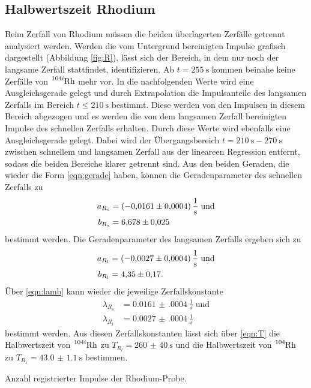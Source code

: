 \subsection{Halbwertszeit Rhodium}
\label{Rhodium}
Beim Zerfall von Rhodium müssen die beiden überlagerten Zerfälle getrennt analysiert werden. Werden die vom Untergrund bereinigten Impulse grafisch dargestellt (Abbildung \ref{fig:R}), lässt sich der Bereich, in dem nur noch der langsame Zerfall stattfindet, identifizieren. Ab $t=\SI{255}{\s}$ kommen beinahe keine Zerfälle von $\ce{^{104i}Rh}$ mehr vor. In die nachfolgenden Werte wird eine Ausgleichsgerade gelegt und durch Extrapolation die Impulsanteile des langsamen Zerfalls im Bereich $t\leq\SI{210}{\s}$ bestimmt. Diese werden von den Impulsen in diesem Bereich abgezogen und es werden die von dem langsamen Zerfall bereinigten Impulse des schnellen Zerfalls erhalten. Durch diese Werte wird ebenfalls eine Ausgleichsgerade gelegt. Dabei wird der Übergangsbereich $t=\SI{210}{\s}-\SI{270}{\s}$ zwischen schnellem und langsamen Zerfall aus der lineareen Regression entfernt, sodass die beiden Bereiche klarer getrennt sind. Aus den beiden Geraden, die wieder die Form \eqref{eqn:gerade} haben, können die Geradenparameter des schnellen Zerfalls zu 
\begin{align*}
a_{R_s} & = \SI{-0.0161(0004)}{\frac{1}{\s}} \;\text{und}  \\
b_{R_s} & = \num{6.678(025)}
\end{align*}
bestimmt werden. Die Geradenparameter des langsamen Zerfalls ergeben sich zu 
\begin{align*}
a_{R_l} & =\SI{-0.0027(0004)}{\frac{1}{\s}} \;\text{und} \\ 
b_{R_l} & =\num{4.35(17)}.
\end{align*} 
Über \eqref{eqn:lamb} kann wieder die jeweilige Zerfallskonstante
\begin{align*}
 \lambda_{R_s} & = \SI{0.0161(0004)}{\frac{1}{s}}  \; \text{und}\\
 \lambda_{R_l} & = \SI{0.0027(0004)}{\frac{1}{s}}
 \end{align*}
 bestimmt werden. Aus diesen Zerfallskonstanten lässt sich über \eqref{eqn:T} die Halbwertszeit von $\ce{^{104i}Rh}$ zu $T_{R_l}=\SI{260(40)}{\s}$ und die Halbwertszeit von $\ce{^{104}Rh}$ zu $T_{R_s}=\SI{43.0(11)}{\s}$ bestimmen.



\begin{table}
\centering
\caption{Anzahl registrierter Impulse der Rhodium-Probe.}
\label{tab:R}
\end{table}

